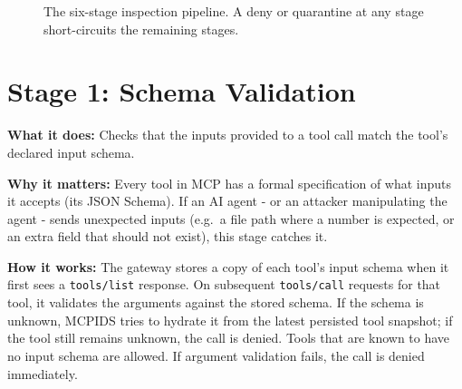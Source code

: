 \documentclass[12pt,a4paper]{report}
\begin{document}
\begin{figure}[H]
\centering
{}
\caption{The six-stage inspection pipeline. A deny or quarantine at any stage short-circuits the remaining stages.}
\end{figure}

\section{Stage 1: Schema Validation}

\textbf{What it does:} Checks that the inputs provided to a tool call match
the tool's declared input schema.

\textbf{Why it matters:} Every tool in MCP has a formal specification of what
inputs it accepts (its JSON Schema). If an AI agent - or an attacker
manipulating the agent - sends unexpected inputs (e.g.\ a file path where a
number is expected, or an extra field that should not exist), this stage catches it.

\textbf{How it works:} The gateway stores a copy of each tool's input schema
when it first sees a \texttt{tools/list} response. On subsequent
\texttt{tools/call} requests for that tool, it validates the arguments against
the stored schema. If the schema is unknown, MCPIDS tries to hydrate it from the
latest persisted tool snapshot; if the tool still remains unknown, the call is
denied. Tools that are known to have no input schema are allowed. If argument
validation fails, the call is denied immediately.
\end{document}
